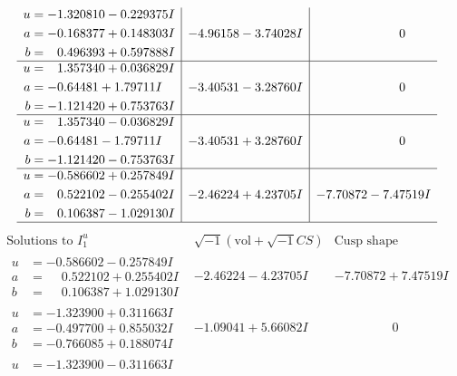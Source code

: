 \documentclass[1p]{elsarticle_modified}
\theoremstyle{definition}
\newcommand{\I}{\sqrt{-1}}
\begin{document}
$$\begin{array}{c|c|c}
\begin{aligned}
u &= -1.320810 - 0.229375 I \\
a &= -0.168377 + 0.148303 I \\
b &= \phantom{-}0.496393 + 0.597888 I\end{aligned}
 & -4.96158 - 3.74028 I & \phantom{-0.000000 } 0 \\ \hline\begin{aligned}
u &= \phantom{-}1.357340 + 0.036829 I \\
a &= -0.64481 + 1.79711 I \\
b &= -1.121420 + 0.753763 I\end{aligned}
 & -3.40531 - 3.28760 I & \phantom{-0.000000 } 0 \\ \hline\begin{aligned}
u &= \phantom{-}1.357340 - 0.036829 I \\
a &= -0.64481 - 1.79711 I \\
b &= -1.121420 - 0.753763 I\end{aligned}
 & -3.40531 + 3.28760 I & \phantom{-0.000000 } 0 \\ \hline\begin{aligned}
u &= -0.586602 + 0.257849 I \\
a &= \phantom{-}0.522102 - 0.255402 I \\
b &= \phantom{-}0.106387 - 1.029130 I\end{aligned}
 & -2.46224 + 4.23705 I & -7.70872 - 7.47519 I\\
 \hline 
 \end{array}$$\newpage$$\begin{array}{c|c|c}  
\text{Solutions to }I^u_{1}& \I (\text{vol} + \sqrt{-1}CS) & \text{Cusp shape}\\
 \hline 
\begin{aligned}
u &= -0.586602 - 0.257849 I \\
a &= \phantom{-}0.522102 + 0.255402 I \\
b &= \phantom{-}0.106387 + 1.029130 I\end{aligned}
 & -2.46224 - 4.23705 I & -7.70872 + 7.47519 I \\ \hline\begin{aligned}
u &= -1.323900 + 0.311663 I \\
a &= -0.497700 + 0.855032 I \\
b &= -0.766085 + 0.188074 I\end{aligned}
 & -1.09041 + 5.66082 I & \phantom{-0.000000 } 0 \\ \hline\begin{aligned}
u &= -1.323900 - 0.311663 I \\

\end{aligned}
\end{array}$$
\end{document}
